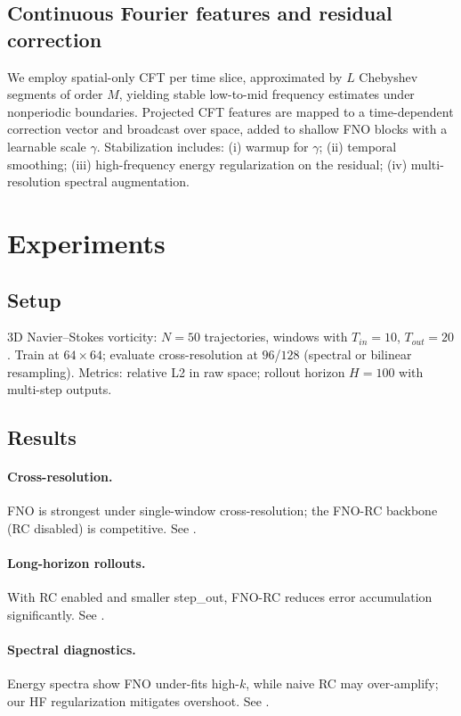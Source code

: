 \documentclass[11pt,twocolumn]{article}
\begin{document}
\subsection{Continuous Fourier features and residual correction}
We employ spatial-only CFT per time slice, approximated by $L$ Chebyshev segments of order $M$, yielding stable low-to-mid frequency estimates under nonperiodic boundaries. Projected CFT features are mapped to a time-dependent correction vector and broadcast over space, added to shallow FNO blocks with a learnable scale $\gamma$. Stabilization includes: (i) warmup for $\gamma$; (ii) temporal smoothing; (iii) high-frequency energy regularization on the residual; (iv) multi-resolution spectral augmentation.

\section{Experiments}
\subsection{Setup}
3D Navier--Stokes vorticity: $N=50$ trajectories, windows with $T_{in}=10$, $T_{out}=20$. Train at $64\times64$; evaluate cross-resolution at $96$/$128$ (spectral or bilinear resampling). Metrics: relative L2 in raw space; rollout horizon $H=100$ with multi-step outputs.

\subsection{Results}
\paragraph{Cross-resolution.} FNO is strongest under single-window cross-resolution; the FNO-RC backbone (RC disabled) is competitive. See .
\paragraph{Long-horizon rollouts.} With RC enabled and smaller step\_out, FNO-RC reduces error accumulation significantly. See .
\paragraph{Spectral diagnostics.} Energy spectra show FNO under-fits high-$k$, while naive RC may over-amplify; our HF regularization mitigates overshoot. See .
\end{document}
